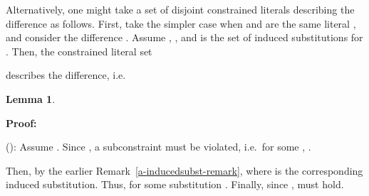 \documentclass[a4paper]{article}
\newcommand{\startproof}{{\bf Proof:~}}
\newtheorem{lemm}[defi]{Lemma}
\begin{document}
Alternatively, one might take a set of disjoint constrained literals describing the difference as follows. 
First, take the simpler case when  and   are the same literal , and consider the difference . 
Assume , , 
and  is the set of induced substitutions for .
Then, the constrained literal set 

describes the difference, i.e.\

\begin{lemm}

\end{lemm}

\noindent
\startproof 

(): Assume . 
Since , a subconstraint  must be violated, i.e.\ 
for some , . 

Then, by the earlier Remark~\ref{a-inducedsubst-remark},  where  is the corresponding induced substitution. Thus,
 for some substitution . 
Finally, since ,  must hold.
\end{document}
